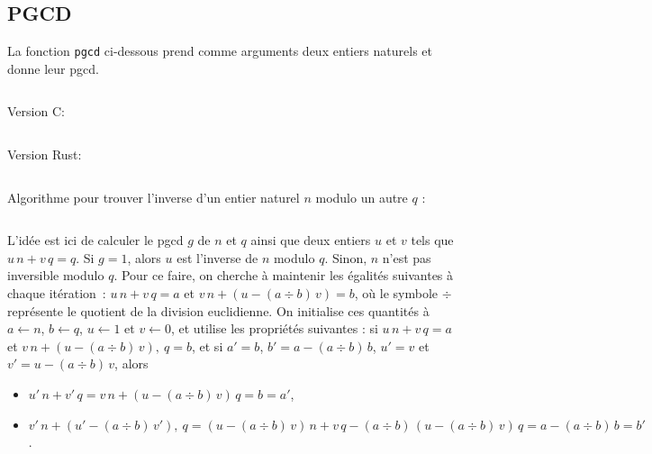 \subsection{PGCD}
\label{app:Haskell_pgcd}

\noindent 
La fonction \texttt{pgcd} ci-dessous prend comme arguments deux entiers naturels et donne leur pgcd.

\vspace*{1ex}

\noindent
{}
\vspace*{-1ex}
\inputminted{Haskell}{Ensembles_Arithmétique/Code/pgcd.hs}

\medskip

\noindent Version C: 
\inputminted{C}{Ensembles_Arithmétique/Code/pgcd.c}

\medskip

\noindent Version Rust: 
{\color{white}
\inputminted{Rust}{Ensembles_Arithmétique/Code/pgcd.rs}
}

\medskip

\noindent Algorithme pour trouver l'inverse d'un entier naturel $n$ modulo un autre $q$ : 
{\color{white}
\inputminted{Rust}{Ensembles_Arithmétique/Code/inverse_mod.rs}
}

\noindent L'idée est ici de calculer le pgcd $g$ de $n$ et $q$ ainsi que deux entiers $u$ et $v$ tels que $u \, n + v \, q = q$. 
Si $g = 1$, alors $u$ est l'inverse de $n$ modulo $q$. 
Sinon, $n$ n'est pas inversible modulo $q$. 
Pour ce faire, on cherche à maintenir les égalités suivantes à chaque itération : $u \, n + v \, q = a$ et $v \, n + (u - (a \div b) \, v) = b$, où le symbole $\div$ représente le quotient de la division euclidienne. 
On initialise ces quantités à $a \leftarrow n$, $b \leftarrow q$, $u \leftarrow 1$ et $v \leftarrow 0$, et utilise les propriétés suivantes : si $u \, n + v \, q = a$ et $v \, n + (u - (a \div b) \, v) ,\ q = b$, et si $a' = b$, $b' = a - (a \div b) \, b$, $u' = v$ et $v' = u - (a \div b) \, v$, alors
\begin{itemize}[nosep]
    \item $u' \, n + v' \, q = v \, n + (u - (a \div b) \, v) \, q = b = a'$,
    \item $v' \, n + (u' - (a \div b) \, v') ,\ q = (u - (a \div b) \, v) \, n + v \, q - (a \div b) \, (u - (a \div b) \, v) \, q = a - (a \div b) \, b = b'$.
\end{itemize}

